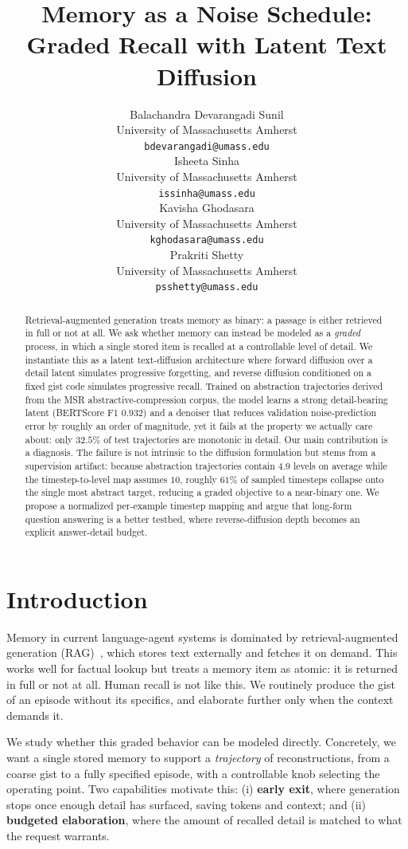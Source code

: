 \documentclass{article}
\title{Memory as a Noise Schedule: Graded Recall with Latent Text Diffusion}
\author{%
  Balachandra Devarangadi Sunil \\
  University of Massachusetts Amherst \\
  \texttt{bdevarangadi@umass.edu} \\
  \And
  Isheeta Sinha \\
  University of Massachusetts Amherst \\
  \texttt{issinha@umass.edu} \\
  \AND
  Kavisha Ghodasara \\
  University of Massachusetts Amherst \\
  \texttt{kghodasara@umass.edu} \\
  \And
  Prakriti Shetty \\
  University of Massachusetts Amherst \\
  \texttt{psshetty@umass.edu} \\
}
\begin{document}
\maketitle

\begin{abstract}
Retrieval-augmented generation treats memory as binary: a passage is either retrieved in full or not at all. We ask whether memory can instead be modeled as a \emph{graded} process, in which a single stored item is recalled at a controllable level of detail. We instantiate this as a latent text-diffusion architecture where forward diffusion over a detail latent simulates progressive forgetting, and reverse diffusion conditioned on a fixed gist code simulates progressive recall. Trained on abstraction trajectories derived from the MSR abstractive-compression corpus, the model learns a strong detail-bearing latent (BERTScore F1 $0.932$) and a denoiser that reduces validation noise-prediction error by roughly an order of magnitude, yet it fails at the property we actually care about: only $32.5\%$ of test trajectories are monotonic in detail. Our main contribution is a diagnosis. The failure is not intrinsic to the diffusion formulation but stems from a supervision artifact: because abstraction trajectories contain $4.9$ levels on average while the timestep-to-level map assumes $10$, roughly $61\%$ of sampled timesteps collapse onto the single most abstract target, reducing a graded objective to a near-binary one. We propose a normalized per-example timestep mapping and argue that long-form question answering is a better testbed, where reverse-diffusion depth becomes an explicit answer-detail budget.
\end{abstract}

\section{Introduction}

Memory in current language-agent systems is dominated by retrieval-augmented generation (RAG)~\citep{lewis2020}, which stores text externally and fetches it on demand. This works well for factual lookup but treats a memory item as atomic: it is returned in full or not at all. Human recall is not like this. We routinely produce the gist of an episode without its specifics, and elaborate further only when the context demands it.

We study whether this graded behavior can be modeled directly. Concretely, we want a single stored memory to support a \emph{trajectory} of reconstructions, from a coarse gist to a fully specified episode, with a controllable knob selecting the operating point. Two capabilities motivate this: (i) \textbf{early exit}, where generation stops once enough detail has surfaced, saving tokens and context; and (ii) \textbf{budgeted elaboration}, where the amount of recalled detail is matched to what the request warrants.
\end{document}

